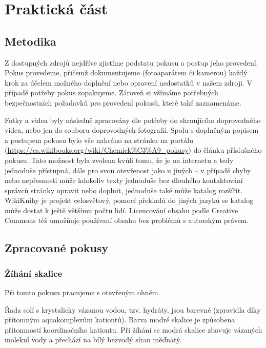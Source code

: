 \chapter{Praktická část}

\section{Metodika}
Z dostupných zdrojů nejdříve zjistíme podstatu pokusu a postup jeho provedení. Pokus provedeme, přičemž dokumentujeme (fotoaparátem či kamerou) každý krok za účelem možného doplnění nebo opravení nedostatků v našem zdroji. V případě potřeby pokus zopakujeme. Zároveň si všímáme potřebných bezpečnostních požadavků pro provedení pokusů, které také zaznamenáme.

Fotky a videa byly následně zpracovány dle potřeby do shrnujícího doprovodného videa, nebo jen do souboru doprovodných fotografií. Spolu s doplněným popisem a postupem pokusu bylo vše nahráno na stránku  na portálu  (\url{https://cs.wikibooks.org/wiki/Chemick%C3%A9_pokusy}) do článku příslušného pokusu. Tato možnost byla zvolena kvůli tomu, že je na internetu a tedy jednoduše přístupná, dále pro svou otevřenost jako u jiných \uv{wiki projektů} -- v případě chyby nebo nepřesnosti může kdokoliv texty jednoduše bez dlouhého kontaktování správců stránky opravit nebo doplnit, jednoduše také může katalog rozšířit. WikiKnihy je projekt celosvětový, pomocí překladů do jiných jazyků se katalog může dostat k ještě většímu počtu lidí. Licencování obsahu podle Creative Commons též umožňuje používaní obsahu bez problémů s autorským právem.


\section{Zpracované pokusy}
\subsection{Žíhání skalice}


Při tomto pokusu pracujeme s otevřeným ohněm.

\hspace{-21px} 

Řada solí s krystalicky vázanou vodou, tzv. hydráty, jsou barevné (zpravidla díky přítomným aquakomplexům kationtů). Barva modré skalice je způsobena přítomností koordinačního kationtu. Při žíhání se modrá skalice zbavuje vázaných molekul vody a přechází na bílý bezvodý síran měďnatý.

